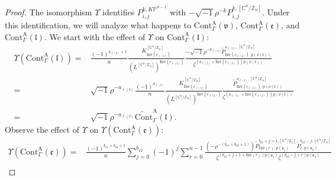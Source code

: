 \documentclass[12pt]{amsart}
\numberwithin{equation}{section}
\newcommand{\CnZn}{[\mathbb{C}^n/\mathbb{Z}_n]}
\newcommand{\KP}{K\mathbb{P}}
\begin{document}
\begin{proof}
The isomorphism $\Upsilon$ identifies $P_{i,j}^{k,\KP^{n-1}}$ with $-\sqrt{-1}\rho^{-k}P_{i,j}^{k,\CnZn}$. Under this identification, we will analyze what happens to $\mathrm{Cont}_{\Gamma}^{\mathrm{A}}(\mathfrak{v})$, $\mathrm{Cont}_{\Gamma}^{\mathrm{A}}(\mathfrak{e})$, and $\mathrm{Cont}_{\Gamma}^{\mathrm{A}}(\mathfrak{l})$. We start with the effect of $\Upsilon$ on $\mathrm{Cont}_{\Gamma}^{\mathrm{A}}(\mathfrak{l})$:
\begin{equation}\label{eqn:leg_contribution_after_upsilon}
\begin{aligned}
\Upsilon\left(\mathrm{Cont}_{\Gamma}^{\mathrm{A}}(\mathfrak{l})\right)
=&\frac{(-1)^{a_{\ell(\mathfrak{l})}+1}}{n}\frac{K^{\CnZn}_{\mathrm{Inv}(c_{\ell(\mathfrak{l})})}}{(L^{\CnZn})^{\mathrm{Inv}(c_{\ell(\mathfrak{l})})}}
\frac{-\sqrt{-1}\rho^{-{a_{\ell(\mathfrak{l})}}}\widetilde{P}_{\mathrm{Inv}(c_{\ell(\mathfrak{l})}),\mathrm{p}(\nu(\mathfrak{l}))}^{{a_{\ell(\mathfrak{l})}},\CnZn}}{     \zeta^{({a_{\ell(\mathfrak{l})}}+{\mathrm{Inv}(c_{\ell(\mathfrak{l})})})\mathrm{p}(\nu(\mathfrak{l}))}}\\
=&\sqrt{-1}\rho^{-{a_{\ell(\mathfrak{l})}}}\frac{(-1)^{a_{\ell(\mathfrak{l})}}}{n}\frac{K^{\CnZn}_{\mathrm{Inv}(c_{\ell(\mathfrak{l})})}}{(L^{\CnZn})^{\mathrm{Inv}(c_{\ell(\mathfrak{l})})}}
\frac{\widetilde{P}_{\mathrm{Inv}(c_{\ell(\mathfrak{l})}),\mathrm{p}(\nu(\mathfrak{l}))}^{{a_{\ell(\mathfrak{l})}},\CnZn}}{     \zeta^{({a_{\ell(\mathfrak{l})}}+{\mathrm{Inv}(c_{\ell(\mathfrak{l})})})\mathrm{p}(\nu(\mathfrak{l}))}} \\
=&\sqrt{-1}\rho^{-{a_{\ell(\mathfrak{l})}}}\widetilde{\mathrm{Cont}}_{\Gamma}^{\mathrm{A}}(\mathfrak{l}).
\end{aligned}
\end{equation}
Observe the effect of $\Upsilon$ on $\Upsilon\left(\mathrm{Cont}_{\Gamma}^{\mathrm{A}}(\mathfrak{e})\right)$:
\begin{equation}\label{eqn:edge_contribution_after_upsilon}
\begin{aligned}
\Upsilon\left(\mathrm{Cont}_{\Gamma}^{\mathrm{A}}(\mathfrak{e})\right)
=&\frac{(-1)^{b_{\mathfrak{e}1}+b_{\mathfrak{e}2}+1}}{n} \sum_{j=0}^{b_{\mathfrak{e}2}}(-1)^{j} \sum_{r=0}^{n-1}\frac{\left(-\rho^{-(b_{\mathfrak{e}1}+b_{\mathfrak{e}2}+1)}\right)\widetilde{P}_{\mathrm{Inv}(r),\mathrm{p}(\mathfrak{v}_1)}^{b_{\mathfrak{e}1}+j+1,\CnZn}\widetilde{P}_{r,\mathrm{p}(\mathfrak{v}_2)}^{b_{\mathfrak{e}2}-j,\CnZn}}{\zeta^{(b_{\mathfrak{e}1}+j+1+\mathrm{Inv}(r))\mathrm{p}(\mathfrak{v}_1)}\zeta^{(b_{\mathfrak{e}2}-j+r)\mathrm{p}(\mathfrak{v}_2)}}\\

\end{aligned}
\end{equation}
\end{proof}
\end{document}
